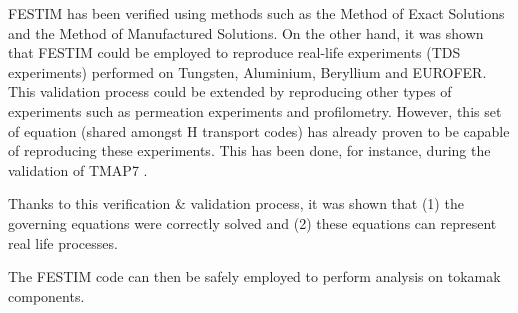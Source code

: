 FESTIM has been verified using methods such as the Method of Exact Solutions and the Method of Manufactured Solutions.
On the other hand, it was shown that FESTIM could be employed to reproduce real-life experiments (TDS experiments) performed on Tungsten, Aluminium, Beryllium and EUROFER.
This validation process could be extended by reproducing other types of experiments such as permeation experiments and profilometry.
However, this set of equation (shared amongst H transport codes) has already proven to be capable of reproducing these experiments.
This has been done, for instance, during the validation of TMAP7 .

Thanks to this verification \& validation process, it was shown that (1) the governing equations were correctly solved and (2) these equations can represent real life processes.

The FESTIM code can then be safely employed to perform analysis on tokamak components.

